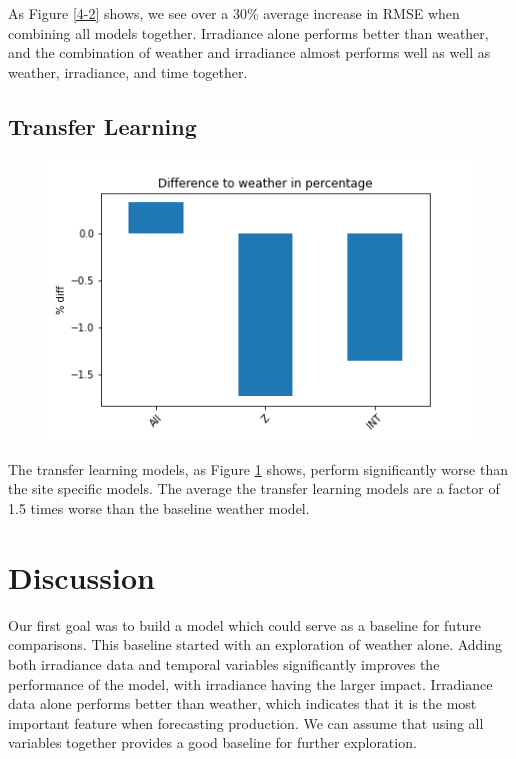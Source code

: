 \documentclass[11pt, fullpage,letterpaper]{article}
\begin{document}
As Figure \ref{4-2} shows, we see over a 30\% average increase in RMSE when combining all models together. Irradiance alone performs better than weather, and the combination of weather and irradiance almost performs well as well as weather, irradiance, and time together.

\subsection{Transfer Learning}

\begin{figure}[!htb]
    \centering
    \includegraphics[scale=0.75]{../plots/regression_report/4-3}
    \caption{}
    \label{4-3}
\end{figure}

The transfer learning models, as Figure \ref{4-3} shows, perform significantly worse than the site specific models. The average the transfer learning models are a factor of 1.5 times worse than the baseline weather model.

\FloatBarrier

\section{Discussion}

Our first goal was to build a model which could serve as a baseline for future comparisons. This baseline started with an exploration of weather alone. Adding both irradiance data and temporal variables significantly improves the performance of the model, with irradiance having the larger impact. Irradiance data alone performs better than weather, which indicates that it is the most important feature when forecasting production. We can assume that using all variables together provides a good baseline for further exploration. 
\end{document}
